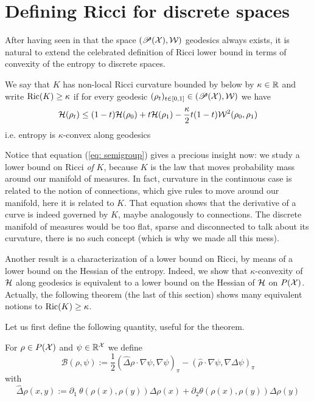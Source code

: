 \section{Defining Ricci for discrete spaces} \label{sec: Riccidef}
After having seen in that the space $(\mathscr{P}(\mathcal{X}),\mathcal{W})$ geodesics always exists, it is natural to extend the celebrated definition of Ricci lower bound in terms of convexity of the entropy to discrete spaces.
\begin{definition}
    We say that $K$ has non-local Ricci curvature bounded by below by $\kappa\in\mathbb{R}$ and write $\mathop{\mathrm{Ric}}\nolimits(K)\ge\kappa$ if for every geodesic $(\rho_t)_{t\in[0,1]} \in (\mathscr{P}(\mathcal{X}),\mathcal{W})$ we have
    \[
    \mathcal{H}(\rho_t) \le (1-t)\mathcal{H}(\rho_0) + t\mathcal{H}(\rho_1) - \frac{\kappa}{2}t(1-t)\mathcal{W}^2(\rho_0,\rho_1)
    \]
    i.e. entropy is $\kappa$-convex along geodesics 
\end{definition}

\begin{remark}
    Notice that equation (\ref{eq: semigroup}) gives a precious insight now: we study a lower bound on Ricci \textit{of} $K$, because $K$ is the law that moves probability mass around our manifold of measures. In fact, curvature in the continuous case is related to the notion of connections, which give rules to move around our manifold, here it is related to $K$. That equation shows that the derivative of a curve is indeed governed by $K$, maybe analogously to connections. The discrete manifold of measures would be too flat, sparse and disconnected to talk about its curvature, there is no such concept (which is why we made all this mess). 
\end{remark}

Another result is a characterization of a lower bound on Ricci, by means of a lower bound on the Hessian of the entropy. Indeed, we show that $\kappa$-convexity of $\mathcal{H}$ along geodesics is equivalent to a lower bound on the Hessian of $\mathcal{H}$ on $P(\mathcal{X})$. Actually, the following theorem (the last of this section) shows many equivalent notions to $\mathop{\mathrm{Ric}}\nolimits(K)\ge\kappa$.

Let us first define the following quantity, useful for the theorem. 

For $\rho \in P(\mathcal{X})$ and $\psi \in \mathbb{R}^{\mathcal{X}}$ we define
\begin{equation}\label{eq: discreteBochner}
    \mathcal{B}(\rho,\psi) := \frac{1}{2}(\hat \Delta \rho \cdot \nabla \psi, \nabla \psi )_\pi - (\hat \rho \cdot \nabla \psi, \nabla \Delta\psi)_\pi
\end{equation}
with
\[
\hat\Delta\rho(x,y):= \partial_1\ \theta(\rho(x),\rho(y))\Delta\rho(x) + \partial_2\theta(\rho(x),\rho(y)) \Delta \rho (y)
\]

